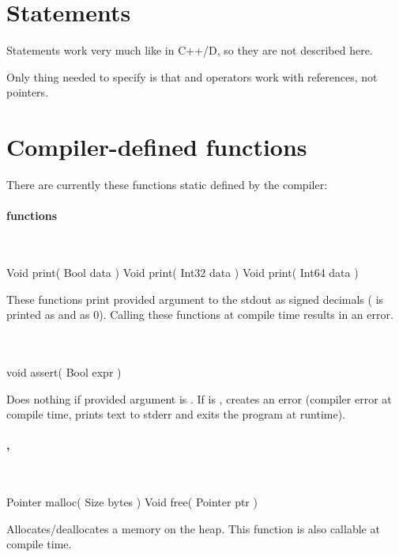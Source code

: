 \section{Statements}
Statements work very much like in C++/D, so they are not described here.

Only thing needed to specify is that  and  operators work with references, not pointers.

\section{Compiler-defined functions} \label{compilerFunctions}
There are currently these functions static defined by the compiler:

\paragraph{ functions}~

\begin{code}
Void print( Bool data )
Void print( Int32 data )
Void print( Int64 data )
\end{code}
These functions print provided argument to the stdout as signed decimals ( is printed as  and  as 0). Calling these functions at compile time results in an error.

\paragraph{}~

\begin{code}
void assert( Bool expr )
\end{code}
Does nothing if provided argument is . If  is , creates an error (compiler error at compile time, prints text to stderr and exits the program at runtime).

\paragraph{, }~

\begin{code}
	Pointer malloc( Size bytes )
	Void free( Pointer ptr )
\end{code}
Allocates/deallocates a memory on the heap. This function is also callable at compile time.

